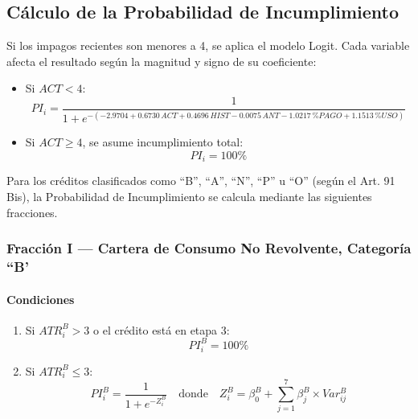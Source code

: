 \subsection{Cálculo de la Probabilidad de Incumplimiento}

Si los impagos recientes son menores a 4, se aplica el modelo Logit. Cada variable afecta el resultado según la magnitud y signo de su coeficiente:

\begin{itemize}
    \item Si $\mathit{ACT} < 4$:
        \begin{equation}
            \mathit{PI}_i = \frac{1}{1 + e^{-(-2.9704 + 0.6730\,\mathit{ACT} + 0.4696\,\mathit{HIST} - 0.0075\,\mathit{ANT} - 1.0217\,\text{\%}\mathit{PAGO} + 1.1513\,\text{\%}\mathit{USO})}}
        \end{equation}
    \item Si $\mathit{ACT} \geq 4$, se asume incumplimiento total:
        \begin{equation}
            \mathit{PI}_i = 100\%
        \end{equation}
\end{itemize}

Para los créditos clasificados como ``B'', ``A'', ``N'', ``P'' u ``O'' (según el Art. 91 Bis), la Probabilidad de Incumplimiento se calcula mediante las siguientes fracciones.

\renewcommand{\arraystretch}{1.3} %

\subsubsection{Fracción I --- Cartera de Consumo No Revolvente, Categoría ``B'}

\paragraph*{Condiciones}

\begin{enumerate}[label=\alph*)]
    \item Si $ATR_i^B > 3$ o el crédito está en etapa 3:
        \begin{equation}
            PI_i^B = 100\%
        \end{equation}
    \item Si $ATR_i^B \leq 3$:
        \begin{equation}
            PI_i^B = \frac{1}{1 + e^{-Z_i^B}} \quad \text{donde} \quad Z_i^B = \beta_0^B + \sum_{j=1}^{7} \beta_j^B \times Var_{ij}^B
        \end{equation}
\end{enumerate}

